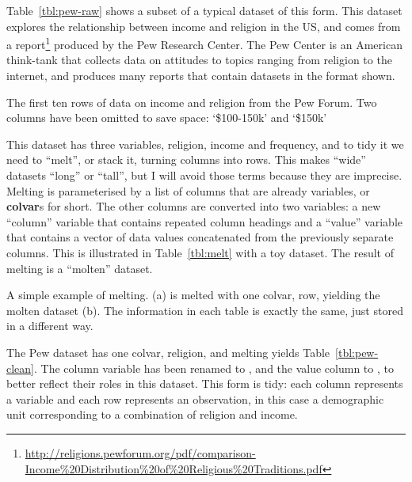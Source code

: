 \documentclass[article]{jss}
\begin{document}
Table~\ref{tbl:pew-raw} shows a subset of a typical dataset of this form. This dataset explores the relationship between income and religion in the US, and comes from a report\footnote{\url{http://religions.pewforum.org/pdf/comparison-Income\%20Distribution\%20of\%20Religious\%20Traditions.pdf}} produced by the Pew Research Center. The Pew Center is an American think-tank that collects data on attitudes to topics ranging from religion to the internet, and produces many reports that contain datasets in the format shown.

\begin{table}[htbp]
  \centering
  
  \caption{The first ten rows of data on income and religion from the Pew Forum. Two columns have been omitted to save space: `\$100-150k' and `\$150k'} 
  \label{tbl:pew-raw}
\end{table}

This dataset has three variables, religion, income and frequency, and to tidy it we need to ``melt'', or stack it, turning columns into rows. This makes ``wide'' datasets ``long'' or ``tall'', but I will avoid those terms because they are imprecise. Melting is parameterised by a list of columns that are already variables, or \textbf{colvar}s for short. The other columns are converted into two variables: a new ``column'' variable that contains repeated column headings and a ``value'' variable that contains a vector of data values concatenated from the previously separate columns. This is illustrated in Table~\ref{tbl:melt} with a toy dataset. The result of melting is a ``molten'' dataset.

\begin{table}
  \centering
  \hspace{2em}%

  \caption{A simple example of melting. (a) is melted with one colvar, row, yielding the molten dataset (b). The information in each table is exactly the same, just stored in a different way.}
  \label{tbl:melt} 
\end{table}

The Pew dataset has one colvar, religion, and melting yields Table~\ref{tbl:pew-clean}. The column variable has been renamed to , and the value column to , to better reflect their roles in this dataset. This form is tidy: each column represents a variable and each row represents an observation, in this case a demographic unit corresponding to a combination of religion and income.
\end{document}
